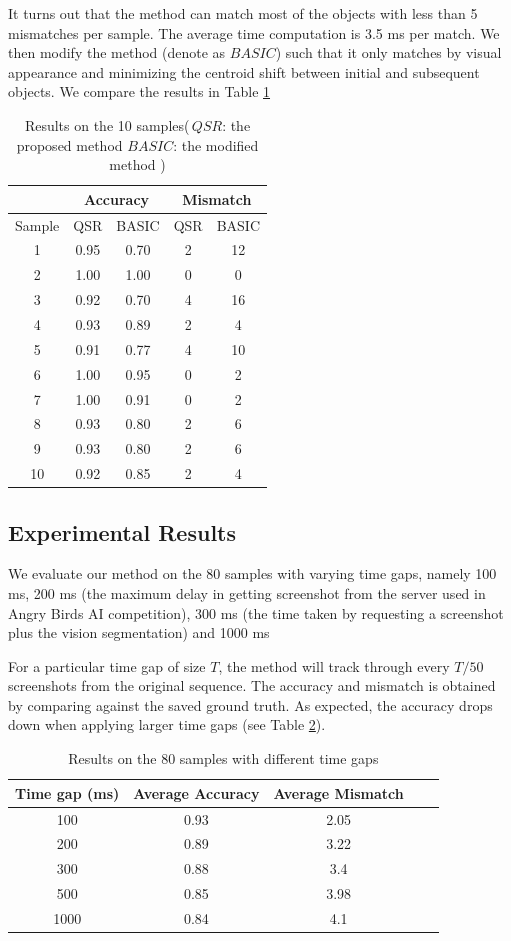 \documentclass[letterpaper]{article}
\begin{document}
It turns out that the method can match most of the objects with less than 5 mismatches per sample. The average time computation is 3.5 ms per match. We then modify the method (denote as $BASIC$) such that it only matches by visual appearance and minimizing the centroid shift between initial and subsequent objects. We compare the results in Table \ref{empiResults}
\begin{table}
\caption{Results on the 10 samples(\,$QSR$: the proposed method $BASIC$: the modified method )}\label{empiResults}
\centering
\begin{tabular}{c|c|c|c|c}
\hline
{} & \multicolumn{2}{c}{Accuracy} & \multicolumn{2}{c}{Mismatch}\\
\hline
Sample & QSR & BASIC & QSR & BASIC \\
\hline
1& 0.95 & 0.70 & 2 & 12\\
2&1.00 & 1.00 & 0 & 0\\
3&0.92 & 0.70 & 4 & 16\\
4&0.93 & 0.89 & 2 & 4\\
5&0.91 & 0.77 & 4 & 10\\
6&1.00 & 0.95 & 0 & 2\\
7&1.00 & 0.91 & 0 & 2\\
8&0.93 & 0.80 & 2 & 6 \\
9&0.93 & 0.80 & 2 & 6\\
10&0.92 & 0.85 & 2 & 4\\
\hline
\end{tabular}
\end{table}

\subsection{Experimental Results}

We evaluate our method on the 80 samples with varying time gaps, namely 100 ms, 200 ms (the maximum delay in getting screenshot from the server used in Angry Birds AI competition), 300 ms (the time taken by requesting a screenshot plus the vision segmentation) and 1000 ms

For a particular time gap of size $T$, the method will track through every $T/50$ screenshots from the original sequence. The accuracy and mismatch is obtained by comparing against the saved ground truth. As expected, the accuracy drops down when applying larger time gaps (see Table \ref{empiResults_2}).  

\begin{table}
\caption{Results on the 80 samples with different time gaps}\label{empiResults_2}
\centering
\begin{tabular}{c|c|c|c|c}
\hline
Time gap (ms) & Average Accuracy & Average Mismatch \\
\hline
100 & 0.93 & 2.05\\
200 & 0.89 & 3.22\\
300 & 0.88 & 3.4\\
500 & 0.85 & 3.98\\
1000 & 0.84 & 4.1\\
\hline
\end{tabular}
\end{table}
\end{document}
